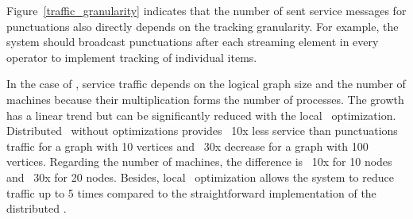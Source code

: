 Figure~\ref{traffic_granularity} indicates that the number of sent service messages for punctuations also directly depends on the tracking granularity. For example, the system should broadcast punctuations after each streaming element in every operator to implement tracking of individual items. 

In the case of \tracker, service traffic depends on the logical graph size and the number of machines because their multiplication forms the number of processes. The growth has a linear trend but can be significantly reduced with the local \tracker\ optimization. Distributed \tracker\ without optimizations provides ~10x less service than punctuations traffic for a graph with 10 vertices and ~30x decrease for a graph with 100 vertices. Regarding the number of machines, the difference is ~10x for 10 nodes and ~30x for 20 nodes. Besides, local \tracker\ optimization allows the system to reduce traffic up to 5 times compared to the straightforward implementation of the distributed \tracker.

